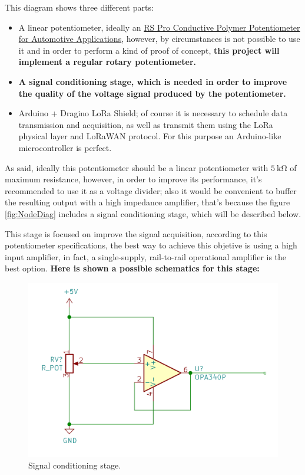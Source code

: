 \documentclass[11pt,a4paper,dvipsnames,twoside]{article}
\newcounter{subsubsubsection}[subsubsection]
\newcommand{\doubt}[1] {\textbf{\color{Red3}#1}}
\begin{document}
This diagram shows three different parts: 

\begin{itemize}
  \item A linear potentiometer, ideally an \href{https://docs.rs-online.com/37bf/0900766b814f0bd0.pdf}{RS Pro Conductive Polymer
  Potentiometer for Automotive Applications}, however, by circumstances is not possible to use it and in order to perform a kind of proof of concept, \doubt{this project will implement a regular rotary potentiometer.}
  \item \doubt{A signal conditioning stage, which is needed in order to improve the quality of the voltage signal produced by the potentiometer.}
  \item Arduino + Dragino LoRa Shield; of course it is necessary to schedule data transmission and acquisition, as well as transmit them using the LoRa physical layer and LoRaWAN protocol. For this purpose an Arduino-like microcontroller is perfect.  
\end{itemize}

As said, ideally this potentiometer should be a linear potentiometer with $5\ \si{\kilo\ohm}$ of maximum resistance, however, in order to improve its performance, it's recommended to use it as a voltage divider; also it would be convenient to buffer the resulting output with a high impedance amplifier, that's because the figure \ref{fig:NodeDiag} includes a signal conditioning stage, which will be described below.

This stage is focused on improve the signal acquisition, according to this potentiometer specifications, the best way to achieve this objetive is using a high input amplifier, in fact, a single-supply, rail-to-rail operational amplifier is the best option. \doubt{Here is shown a possible schematics for this stage:}

\begin{figure}[htp]
  \centering
    \includegraphics[width=.9\textwidth]{../../schemes/Signal_Conditioning.png}
  \caption{Signal conditioning stage.}
  \label{fig:SignalCond}
\end{figure}
\end{document}
